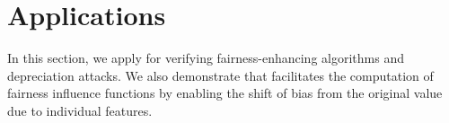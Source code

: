 \section{Applications}\label{fvgm_sec:applications}
In this section, we apply {\fvgm} for verifying fairness-enhancing algorithms and depreciation attacks. We also demonstrate that {\fvgm} facilitates the computation of fairness influence functions by enabling the shift of bias from the original value due to individual features. 


